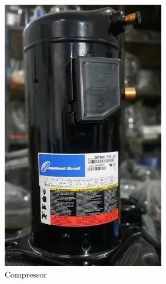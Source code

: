 \begin{figure}[ht]
\begin{subfigure}[b]{0.17\textwidth}
        \includegraphics[width=\textwidth]{assets/design/machine-compressor.jpg}
        \caption{\footnotesize Compressor}
        \label{fig:machine:compressor}
    \end{subfigure}
    \hfill
    \begin{subfigure}[b]{0.31\textwidth}
    		\centering

\end{subfigure}
\end{figure}
